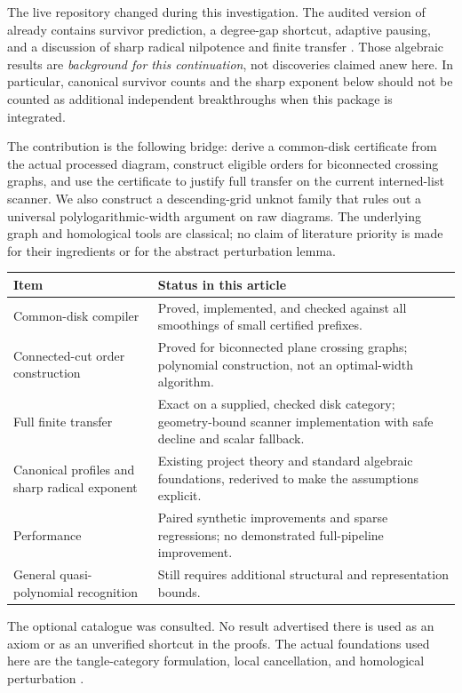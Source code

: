 \documentclass[11pt]{article}
\theoremstyle{definition}\newtheorem{definition}[theorem]{Definition}
\theoremstyle{remark}\newtheorem{remark}[theorem]{Remark}
\newcommand{\code}[1]{\texttt{\detokenize{#1}}}
\begin{document}
The live repository changed during this investigation. The audited version of
 already contains survivor prediction, a degree-gap
shortcut, adaptive pausing, and a discussion of sharp radical nilpotence and
finite transfer \cite{RepoRadical}. Those algebraic results are \emph{background
for this continuation}, not discoveries claimed anew here. In particular,
canonical survivor counts and the sharp exponent below should not be counted as
additional independent breakthroughs when this package is integrated.

The contribution is the following bridge: derive a common-disk certificate from
the actual processed diagram, construct eligible orders for biconnected crossing
graphs, and use the certificate to justify full transfer on the current
interned-list scanner. We also construct a descending-grid unknot family that
rules out a universal polylogarithmic-width argument on raw diagrams. The
underlying graph and homological tools are classical; no claim of literature
priority is made for their ingredients or for the abstract perturbation lemma.

\begin{center}
\begin{tabularx}{\textwidth}{@{}p{}X@{}}
\toprule
Item & Status in this article\\\midrule
Common-disk compiler & Proved, implemented, and checked against all smoothings of
small certified prefixes.\\
Connected-cut order construction & Proved for biconnected plane crossing graphs;
polynomial construction, not an optimal-width algorithm.\\
Full finite transfer & Exact on a supplied, checked disk category; geometry-bound
scanner implementation with safe decline and scalar fallback.\\
Canonical profiles and sharp radical exponent & Existing project theory and
standard algebraic foundations, rederived to make the assumptions explicit.\\
Performance & Paired synthetic improvements and sparse regressions;
no demonstrated full-pipeline improvement.\\
General quasi-polynomial recognition & Still requires additional structural and
representation bounds.\\\bottomrule
\end{tabularx}
\end{center}

The optional \code{openai/math} catalogue was consulted. No result advertised
there is used as an axiom or as an unverified shortcut in the proofs. The actual
foundations used here are the tangle-category formulation, local cancellation,
and homological perturbation \cite{Khovanov2002,BarNatan2007,Crainic2004}.
\end{document}
